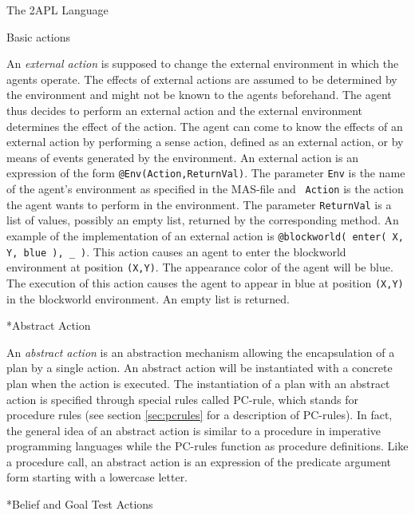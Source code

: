 \begin{chapter}{The 2APL Language}
\begin{section}{Basic actions}
\begin{subsection}
An \emph{external action} is supposed to change the external
environment in which the agents operate. The effects of external
actions are assumed to be determined by the environment and might
not be known to the agents beforehand. The agent thus decides to
perform an external action and the external environment determines
the effect of the action. The agent can come to know the effects of
an external action by performing a sense action, defined as an
external action, or by means of events generated by the environment.
An external action  is an expression of the form
{\tt @Env(Action,ReturnVal)}. The parameter {\tt Env} is the name of
the agent's environment as specified in the MAS-file and {\tt
Action} is the action the agent wants to perform in the environment.
The parameter {\tt ReturnVal} is a list of values, possibly an empty
list, returned by the corresponding method. An example of the
implementation of an external action is {\tt @blockworld( enter( X,
Y, blue ), \_ )}. This action causes an agent to enter the
blockworld environment at position {\tt (X,Y)}. The appearance color
of the agent will be blue. The execution of this action causes the
agent to appear in blue at position {\tt (X,Y)} in the blockworld
environment. An empty list is returned.
\end{subsection}

\begin{subsection}*{Abstract Action}

An \emph{abstract action} is an abstraction mechanism allowing the
encapsulation of a plan by a single action. An abstract action will
be instantiated with a concrete plan when the action is executed.
The instantiation of a plan with an abstract action is specified
through special rules called PC-rule, which stands for procedure
rules (see section \ref{sec:pcrules} for a description of PC-rules).
In fact, the general idea of an abstract action is similar to a
procedure in imperative programming languages while the PC-rules
function as procedure definitions. Like a procedure call, an
abstract action  is an expression of the
predicate argument form starting with a lowercase letter.
\end{subsection}

\begin{subsection}*{Belief and Goal Test Actions}


\end{subsection}
\end{section}
\end{chapter}

